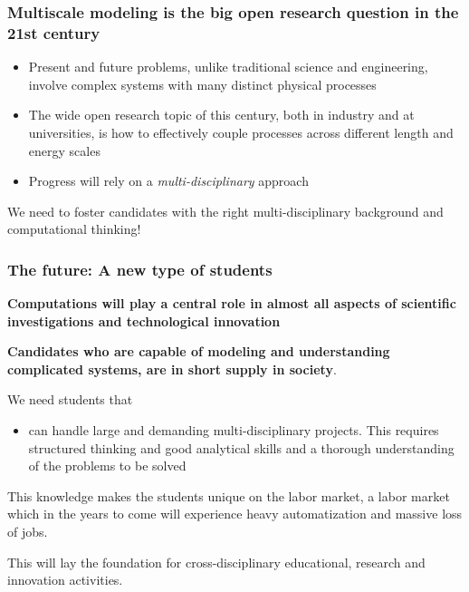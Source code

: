 \documentclass{beamer}
\begin{document}
\begin{frame}
\frametitle{Multiscale modeling is the big open research question in the 21st century}

\begin{block}{}
\begin{itemize}
\item Present and future problems, unlike traditional
  science and engineering, involve complex systems with many distinct
  physical processes

\item The wide open research topic of this century, both in industry and at universities, is how to effectively couple processes across different length and energy scales

\item Progress will rely on a \emph{multi-disciplinary} approach
\end{itemize}

\noindent
\end{block}

\begin{block}{}
We need to foster candidates with the right
multi-disciplinary background and computational thinking!
\end{block}
\end{frame}

\begin{frame}
\frametitle{The future: A new type of students}

\begin{block}{}
\textbf{Computations will play a central role in almost all aspects of scientific investigations and technological innovation}
\end{block}

\begin{block}{}
\textbf{Candidates who are capable of modeling and understanding complicated systems, are in short supply in society}.
\end{block}
\begin{block}{}
We need students that
\begin{itemize}
\item can handle large and demanding multi-disciplinary  projects. This requires structured thinking and good analytical skills and a thorough understanding of the problems to be solved
\end{itemize}

\noindent
This knowledge makes the students unique on the labor market, a labor market which in the years to come will experience heavy automatization and massive loss of jobs.
\end{block}
\begin{block}{}
This will lay the foundation for cross-disciplinary
educational, research and innovation activities.
\end{block}
\end{frame}
\end{document}
